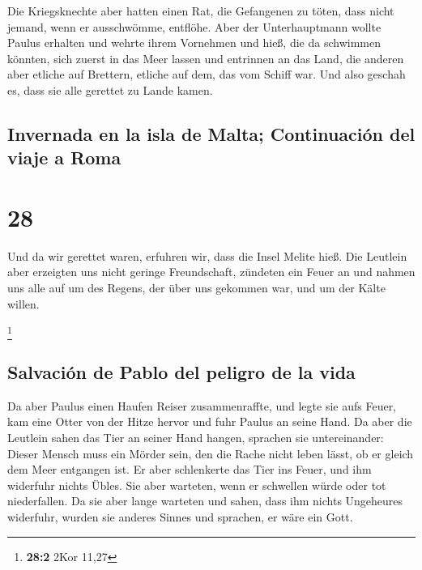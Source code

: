  Die Kriegsknechte aber hatten einen Rat, die Gefangenen
zu töten, dass nicht jemand, wenn er ausschwömme, entflöhe.
 Aber der Unterhauptmann wollte Paulus erhalten und
wehrte ihrem Vornehmen und hieß, die da schwimmen könnten, sich zuerst
in das Meer lassen und entrinnen an das Land,  die
anderen aber etliche auf Brettern, etliche auf dem, das vom Schiff war.
Und also geschah es, dass sie alle gerettet zu Lande kamen.

\hypertarget{invernada-en-la-isla-de-malta-continuaciuxf3n-del-viaje-a-roma}{%
\subsection{Invernada en la isla de Malta; Continuación del viaje a
Roma}\label{invernada-en-la-isla-de-malta-continuaciuxf3n-del-viaje-a-roma}}

\hypertarget{section-27}{%
\section{28}\label{section-27}}

 Und da wir gerettet waren, erfuhren wir, dass die Insel
Melite hieß.  Die Leutlein aber erzeigten uns nicht
geringe Freundschaft, zündeten ein Feuer an und nahmen uns alle auf um
des Regens, der über uns gekommen war, und um der Kälte willen.

\footnote{\textbf{28:2} 2Kor 11,27}

\hypertarget{salvaciuxf3n-de-pablo-del-peligro-de-la-vida}{%
\subsection{Salvación de Pablo del peligro de la
vida}\label{salvaciuxf3n-de-pablo-del-peligro-de-la-vida}}

 Da aber Paulus einen Haufen Reiser zusammenraffte, und
legte sie aufs Feuer, kam eine Otter von der Hitze hervor und fuhr
Paulus an seine Hand.  Da aber die Leutlein sahen das Tier
an seiner Hand hangen, sprachen sie untereinander: Dieser Mensch muss
ein Mörder sein, den die Rache nicht leben lässt, ob er gleich dem Meer
entgangen ist.  Er aber schlenkerte das Tier ins Feuer,
und ihm widerfuhr nichts Übles.  Sie aber warteten, wenn
er schwellen würde oder tot niederfallen. Da sie aber lange warteten und
sahen, dass ihm nichts Ungeheures widerfuhr, wurden sie anderes Sinnes
und sprachen, er wäre ein Gott.

